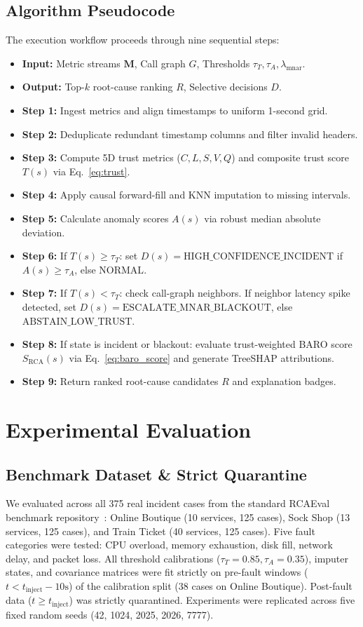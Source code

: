 \documentclass[conference]{IEEEtran}
\begin{document}
\subsection{Algorithm Pseudocode}
The execution workflow proceeds through nine sequential steps:
\begin{itemize}
    \item \textbf{Input:} Metric streams $\mathbf{M}$, Call graph $G$, Thresholds $\tau_T, \tau_A, \lambda_{\text{mnar}}$.
    \item \textbf{Output:} Top-$k$ root-cause ranking $R$, Selective decisions $D$.
    \item \textbf{Step 1:} Ingest metrics and align timestamps to uniform 1-second grid.
    \item \textbf{Step 2:} Deduplicate redundant timestamp columns and filter invalid headers.
    \item \textbf{Step 3:} Compute 5D trust metrics ($C, L, S, V, Q$) and composite trust score $T(s)$ via Eq.~\eqref{eq:trust}.
    \item \textbf{Step 4:} Apply causal forward-fill and KNN imputation to missing intervals.
    \item \textbf{Step 5:} Calculate anomaly scores $A(s)$ via robust median absolute deviation.
    \item \textbf{Step 6:} If $T(s) \ge \tau_T$: set $D(s) = \text{HIGH\_CONFIDENCE\_INCIDENT}$ if $A(s) \ge \tau_A$, else $\text{NORMAL}$.
    \item \textbf{Step 7:} If $T(s) < \tau_T$: check call-graph neighbors. If neighbor latency spike detected, set $D(s) = \text{ESCALATE\_MNAR\_BLACKOUT}$, else $\text{ABSTAIN\_LOW\_TRUST}$.
    \item \textbf{Step 8:} If state is incident or blackout: evaluate trust-weighted BARO score $S_{\text{RCA}}(s)$ via Eq.~\eqref{eq:baro_score} and generate TreeSHAP attributions.
    \item \textbf{Step 9:} Return ranked root-cause candidates $R$ and explanation badges.
\end{itemize}

\section{Experimental Evaluation}

\subsection{Benchmark Dataset \& Strict Quarantine}
We evaluated across all 375 real incident cases from the standard RCAEval benchmark repository~\cite{pham2025rcaeval}: Online Boutique (10 services, 125 cases), Sock Shop (13 services, 125 cases), and Train Ticket (40 services, 125 cases).
Five fault categories were tested: CPU overload, memory exhaustion, disk fill, network delay, and packet loss.
All threshold calibrations ($\tau_T = 0.85, \tau_A = 0.35$), imputer states, and covariance matrices were fit strictly on pre-fault windows ($t < t_{\text{inject}} - 10\text{s}$) of the calibration split (38 cases on Online Boutique).
Post-fault data ($t \ge t_{\text{inject}}$) was strictly quarantined.
Experiments were replicated across five fixed random seeds (42, 1024, 2025, 2026, 7777).
\end{document}
